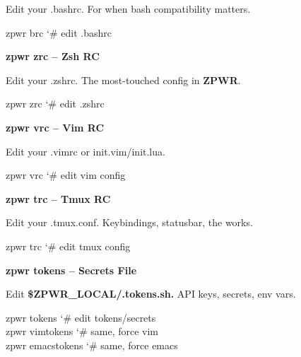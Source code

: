 \documentclass[11pt,a4paper,twoside]{book}
\begin{document}
Edit your .bashrc. For when bash compatibility matters.

\begin{codebox}
\color{neongreen}zpwr brc                    {\char`\#} edit .bashrc\\
\end{codebox}


\vspace{12pt}
{\bfseries\color{neonyellow} zpwr zrc  -- Zsh RC}\vspace{4pt}

Edit your .zshrc. The most-touched config in \textbf{ZPWR}.

\begin{codebox}
\color{neongreen}zpwr zrc                    {\char`\#} edit .zshrc\\
\end{codebox}


\vspace{12pt}
{\bfseries\color{neonyellow} zpwr vrc  -- Vim RC}\vspace{4pt}

Edit your .vimrc or init.vim/init.lua.

\begin{codebox}
\color{neongreen}zpwr vrc                    {\char`\#} edit vim config\\
\end{codebox}


\vspace{12pt}
{\bfseries\color{neonyellow} zpwr trc  -- Tmux RC}\vspace{4pt}

Edit your .tmux.conf. Keybindings, statusbar, the works.

\begin{codebox}
\color{neongreen}zpwr trc                    {\char`\#} edit tmux config\\
\end{codebox}


\vspace{12pt}
{\bfseries\color{neonyellow} zpwr tokens  -- Secrets File}\vspace{4pt}

Edit \textbf{\$ZPWR\_LOCAL/.tokens.sh.} API keys, secrets, env vars.

\begin{codebox}
\color{neongreen}zpwr tokens                 {\char`\#} edit tokens/secrets\\
\color{neongreen}zpwr vimtokens              {\char`\#} same, force vim\\
\color{neongreen}zpwr emacstokens            {\char`\#} same, force emacs\\
\end{codebox}
\end{document}
